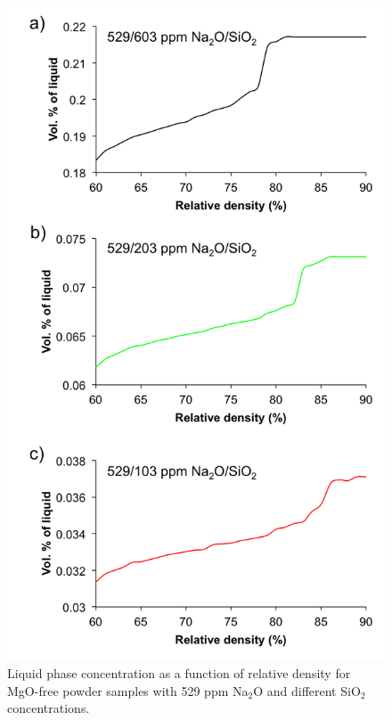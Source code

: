 \newpage
\begin{figure}[H]
	\centering
	\includegraphics[scale=0.8]{Chapter-4/Figures/Figure3.png}
	\caption{Liquid phase concentration as a function of relative density for MgO-free powder samples with 529 ppm Na$_{2}$O and different SiO$_{2}$ concentrations.}
	\label{Ch4-figure:Figure3}
\end{figure}

